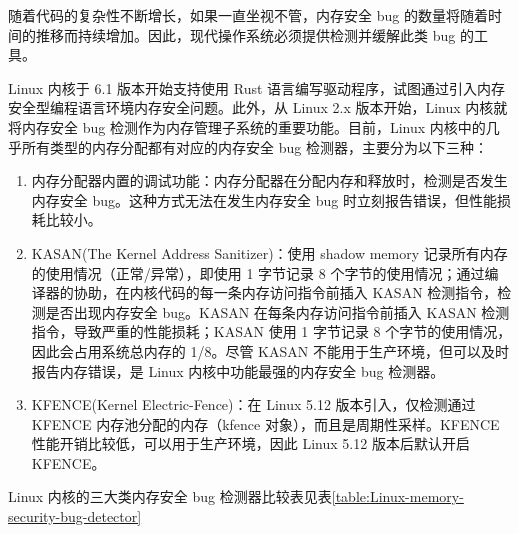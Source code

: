 \documentclass[AutoFakeBold]{LZUThesis}
\begin{document}
\begin{sloppypar}
随着代码的复杂性不断增长，如果一直坐视不管，内存安全 bug
的数量将随着时间的推移而持续增加。因此，现代操作系统必须提供检测并缓解此类
bug 的工具。

Linux 内核于 6.1 版本开始支持使用 Rust
语言编写驱动程序，试图通过引入内存安全型编程语言环境内存安全问题。此外，从
Linux 2.x 版本开始，Linux 内核就将内存安全 bug
检测作为内存管理子系统的重要功能。目前，Linux
内核中的几乎所有类型的内存分配都有对应的内存安全 bug
检测器，主要分为以下三种：

\begin{enumerate}
\def\labelenumi{\arabic{enumi}.}
\item
  内存分配器内置的调试功能：内存分配器在分配内存和释放时，检测是否发生内存安全
  bug。这种方式无法在发生内存安全 bug 时立刻报告错误，但性能损耗比较小。
\item
  KASAN(The Kernel Address Sanitizer)：使用 shadow memory
  记录所有内存的使用情况（正常/异常），即使用 1 字节记录 8
  个字节的使用情况；通过编译器的协助，在内核代码的每一条内存访问指令前插入
  KASAN 检测指令，检测是否出现内存安全 bug。KASAN
  在每条内存访问指令前插入 KASAN 检测指令，导致严重的性能损耗；KASAN
  使用 1 字节记录 8 个字节的使用情况，因此会占用系统总内存的 1/8。尽管
  KASAN 不能用于生产环境，但可以及时报告内存错误，是 Linux
  内核中功能最强的内存安全 bug 检测器。
\item
  KFENCE(Kernel Electric-Fence)：在 Linux 5.12 版本引入，仅检测通过
  KFENCE 内存池分配的内存（kfence 对象），而且是周期性采样。KFENCE
  性能开销比较低，可以用于生产环境，因此 Linux 5.12 版本后默认开启
  KFENCE。
\end{enumerate}

Linux 内核的三大类内存安全 bug 检测器比较表见表\ref{table:Linux-memory-security-bug-detector}


\end{sloppypar}
\end{document}
